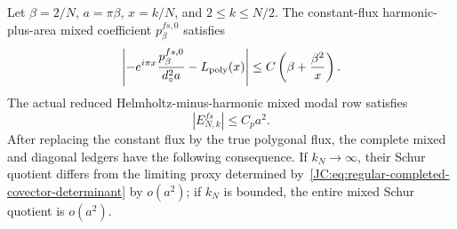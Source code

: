 \begin{lemma}
\label{JC:lem:regular-mixed-uniform-bridge}
Let $\beta=2/N$, $a=\pi\beta$, $x=k/N$, and
$2\le k\le N/2$.  The constant-flux harmonic-plus-area mixed coefficient
$p^{fs,0}_{\beta}$ satisfies
\begin{equation}\label{JC:eq:regular-mixed-CF2P}
 \left|-e^{i\pi x}\frac{p^{fs,0}_{\beta}}{d_\circ^2a}
       -L_{\rm poly}(x)\right|
 \le C\left(\beta+\frac{\beta^2}{x}\right).
\end{equation}
The actual reduced Helmholtz-minus-harmonic mixed modal row satisfies
\begin{equation}\label{JC:eq:regular-mixed-RR-ABS}
 \boxed{|E^{fs}_{N,k}|\le C_pa^2.}
\end{equation}
After replacing the constant flux by the true polygonal flux, the complete
mixed and diagonal ledgers have the following consequence.  If $k_N\to
\infty$, their Schur quotient differs from the limiting proxy determined
by~\eqref{JC:eq:regular-completed-covector-determinant} by $o(a^2)$; if
$k_N$ is bounded, the entire mixed Schur quotient is $o(a^2)$.
\end{lemma}

